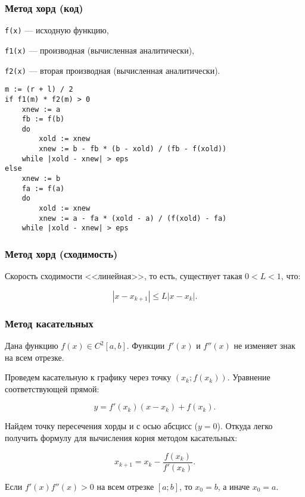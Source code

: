 \documentclass[10pt]{beamer}
\begin{document}
\begin{frame}[fragile]
\frametitle{Метод хорд (код)}
{\tt f(x)} --- исходную функцию,

{\tt f1(x)} --- производная (вычисленная аналитически),

{\tt f2(x)} --- вторая производная (вычисленная аналитически).

\begin{lstlisting}
m := (r + l) / 2
if f1(m) * f2(m) > 0
    xnew := a
    fb := f(b)
    do
        xold := xnew
        xnew := b - fb * (b - xold) / (fb - f(xold))
    while |xold - xnew| > eps
else
    xnew := b
    fa := f(a)
    do
        xold := xnew
        xnew := a - fa * (xold - a) / (f(xold) - fa)
    while |xold - xnew| > eps
\end{lstlisting}

\end{frame}





\begin{frame}[fragile]
\frametitle{Метод хорд (сходимость)}

Скорость сходимости <<линейная>>, то есть, существует такая $0 < L < 1$, что:

$$|x - x_{k+1}| \le L |x - x_{k}|.$$

\end{frame}





\begin{frame}[fragile]
\frametitle{Метод касательных}

Дана функцию $f(x) \in C^{2}[a, b]$. Функции $f'(x)$ и $f''(x)$ не изменяет знак на всем отрезке. 

\vfill

Проведем касательную к графику через точку $(x_k; f(x_k))$. Уравнение соответствующей прямой:

$$y = f'(x_k) (x - x_k) + f(x_k).$$

\vfill

Найдем точку пересечения хорды и с осью абсцисс ($y = 0$). Откуда легко получить формулу для вычисления корня методом касательных:

$$x_{k+1} = x_k - \frac{f(x_k)}{f'(x_k)}.$$

Если $f'(x) f''(x) > 0$ на всем отрезке $[a; b]$, то $x_0 = b$, а иначе $x_0 = a$. 


\end{frame}
\end{document}
